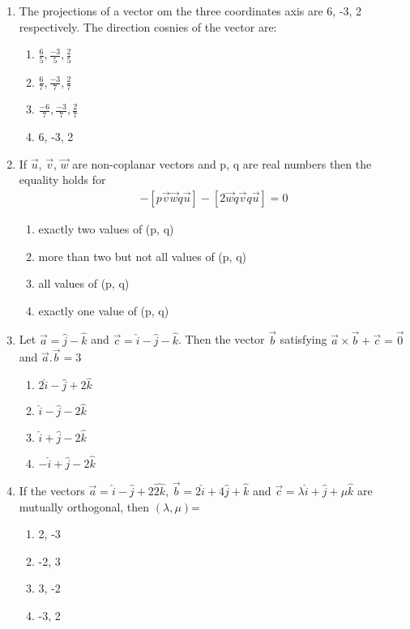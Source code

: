 \begin{enumerate}[label=\arabic*.,ref=\thesubsection.\theenumi]
\item The projections of a vector om the three coordinates axis are 6, -3, 2 respectively. The direction cosnies of the vector are:
\begin{enumerate}
\item $\frac{6}{5}, \frac{-3}{5}, \frac{2}{5}$
\item $\frac{6}{7}, \frac{-3}{7}, \frac{2}{7}$
\item $\frac{-6}{7}, \frac{-3}{7}, \frac{2}{7}$
\item 6, -3, 2
\end{enumerate}

\item If $\overrightarrow{u}$, $\overrightarrow{v}$, $\overrightarrow{w}$ are non-coplanar vectors and p, q are real numbers then the equality holds for
\begin{align*}
[3\overrightarrow{u}p\overrightarrow{v}p\overrightarrow{w}] - [p\overrightarrow{v}\overrightarrow{w}q\overrightarrow{u} ] - [2\overrightarrow{w}q\overrightarrow{v}q\overrightarrow{u}] = 0
\end{align*}
\begin{enumerate}
\item exactly two values of (p, q)
\item more than two but not all values of (p, q)
\item all values of (p, q)
\item exactly one value of (p, q)
\end{enumerate}

\item Let $\overrightarrow{a} = \hat{j} - \hat{k}$ and $\overrightarrow{c} = \hat{i} - \hat{j} - \hat{k}$. Then the vector $\overrightarrow{b}$ satisfying $\overrightarrow{a} \times \overrightarrow{b} + \overrightarrow{c} =\overrightarrow{0}$ and $\overrightarrow{a}.\overrightarrow{b} = 3$
\begin{enumerate}
\item $2\hat{i} - \hat{j} + 2\hat{k}$
\item $\hat{i} - \hat{j} - 2\hat{k}$
\item $\hat{i} + \hat{j} - 2\hat{k}$
\item $-\hat{i} + \hat{j} - 2\hat{k}$
\end{enumerate}

\item If the vectors $\overrightarrow{a} = \hat{i} - \hat{j} + 2\hat{2k}$, $\overrightarrow{b} = 2\hat{i} + 4\hat{j} + \hat{k}$ and $\overrightarrow{c} = \lambda\hat{i} + \hat{j} + \mu\hat{k}$ are mutually orthogonal, then $(\lambda, \mu)$=
\begin{enumerate}
\item 2, -3
\item -2, 3
\item 3, -2
\item -3, 2
\end{enumerate}


\end{enumerate}
